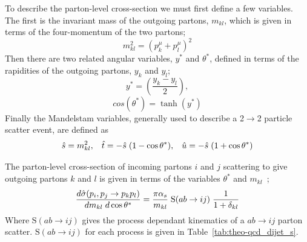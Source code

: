 To describe the parton-level cross-section we must first define a few variables.
The first is the invariant mass of the outgoing partons, $m_{kl}$, which is given in terms of the four-momentum of the two partons;
\begin{equation}
  m_{kl}^2 = (p^\mu_k + p^\mu_l)^2  
\end{equation}
\noindent
Then there are two related angular variables, $y^*$ and $\theta^*$,
defined in terms of the rapidities of the outgoing partons, $y_k$ and $y_l$;
\begin{equation}
  y^* = (\frac{y_k - y_l}{2}),
\end{equation}
\begin{equation}
  cos(\theta^*) = \tanh(y^*)
\end{equation}
\noindent
Finally the Mandelstam variables, generally used to describe a 2$\to$2 particle scatter event, are defined as 
\begin{equation}
  \hat{s} = m_{kl}^2, \hspace{3mm}  \hat{t} = -\hat{s}\hspace{1mm}(1 - \cos{\theta^*}), \hspace{3mm} \hat{u} = - \hat{s}\hspace{1mm}(1+\cos{\theta^*})
\end{equation}

\noindent
The parton-level cross-section of incoming partons $i$ and $j$ scattering to give
outgoing partons $k$ and $l$ is given in terms of the variables $\theta^*$ and $m_{kl}$~\cite{theo-dijet_harris};
\begin{equation}
  \frac{d\hat{\sigma}(p_i, p_j \to p_k p_l)}{dm_{kl}\hspace{1mm}d\cos{\theta^*}} = \frac{ \pi \alpha_s}{m_{kl}}\hspace{1mm} \text{S}(ab \to ij) \hspace{1mm} \frac{1}{1+\delta_{kl}}
  \label{eq:theo-qcd_dijet_xs}
\end{equation}
Where $\text{S}(ab \to ij)$ gives the process dependant kinematics of a $ab \to ij$  parton scatter.
$\text{S}(ab \to ij)$ for each process is given in Table~\ref{tab:theo-qcd_dijet_s}.

%    
%

